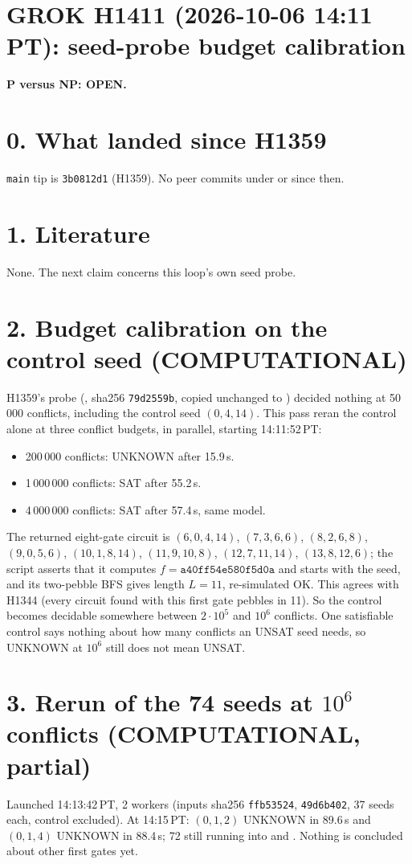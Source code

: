 \documentclass[11pt]{article}
\begin{document}
\sloppy
\section*{GROK H1411 (2026-10-06 14:11 PT): seed-probe budget calibration}
\textbf{P versus NP: OPEN.}

\section*{0. What landed since H1359}
\texttt{main} tip is \texttt{3b0812d1} (H1359). No peer commits under  or  since then.

\section*{1. Literature}
None. The next claim concerns this loop's own seed probe.

\section*{2. Budget calibration on the control seed (COMPUTATIONAL)}
H1359's probe (, sha256 \texttt{79d2559b}, copied unchanged to ) decided nothing at 50\,000 conflicts, including the control seed $(0,4,14)$. This pass reran the control alone at three conflict budgets, in parallel, starting 14:11:52\,PT:
\begin{itemize}
\item 200\,000 conflicts: UNKNOWN after 15.9\,s.
\item 1\,000\,000 conflicts: SAT after 55.2\,s.
\item 4\,000\,000 conflicts: SAT after 57.4\,s, same model.
\end{itemize}
The returned eight-gate circuit is $(6,0,4,14)$, $(7,3,6,6)$, $(8,2,6,8)$, $(9,0,5,6)$, $(10,1,8,14)$, $(11,9,10,8)$, $(12,7,11,14)$, $(13,8,12,6)$; the script asserts that it computes $f=\texttt{a40ff54e580f5d0a}$ and starts with the seed, and its two-pebble BFS gives length $L=11$, re-simulated OK. This agrees with H1344 (every circuit found with this first gate pebbles in 11). So the control becomes decidable somewhere between $2\cdot10^5$ and $10^6$ conflicts. One satisfiable control says nothing about how many conflicts an UNSAT seed needs, so UNKNOWN at $10^6$ still does not mean UNSAT.

\section*{3. Rerun of the 74 seeds at $10^6$ conflicts (COMPUTATIONAL, partial)}
Launched 14:13:42\,PT, 2 workers (inputs  sha256 \texttt{ffb53524},  \texttt{49d6b402}, 37 seeds each, control excluded). At 14:15\,PT: $(0,1,2)$ UNKNOWN in 89.6\,s and $(0,1,4)$ UNKNOWN in 88.4\,s; 72 still running into  and . Nothing is concluded about other first gates yet.
\end{document}
